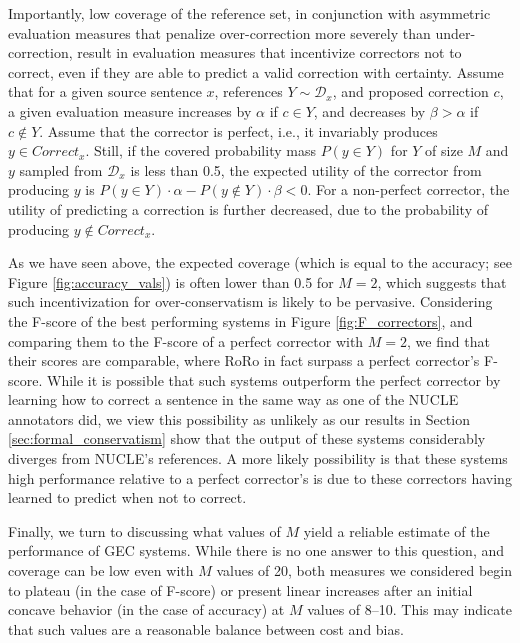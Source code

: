 \documentclass[letter,11pt]{article}
\begin{document}
Importantly, low coverage of the reference set,
in conjunction with asymmetric evaluation measures that penalize over-correction
more severely than under-correction, result in evaluation measures that incentivize
correctors not to correct, even if they are able to predict a valid correction with certainty.
Assume that for a given source sentence $x$, references $Y \sim \mathcal{D}_x$, and proposed correction $c$,
a given evaluation measure increases by $\alpha$ if $c \in Y$, and decreases by $\beta > \alpha$ if $c \notin Y$.
Assume that the corrector is perfect, i.e., it invariably produces $y \in Correct_x$.
Still, if the covered probability mass $P(y \in Y)$ for $Y$ of size $M$ and $y$ sampled from $\mathcal{D}_x$
is less than 0.5, the expected utility of the corrector from producing $y$ is $P(y \in Y) \cdot \alpha - P(y \notin Y) \cdot \beta < 0$.
For a non-perfect corrector, the utility of predicting a correction is further decreased, due to the probability
of producing $y \notin Correct_x$.

As we have seen above, the expected coverage (which is equal to the accuracy; see Figure \ref{fig:accuracy_vals})
is often lower than 0.5 for $M=2$, which suggests that such incentivization for over-conservatism is likely to be
pervasive. Considering the F-score of the best performing systems in Figure \ref{fig:F_correctors}, and
comparing them to the F-score of a perfect corrector with $M=2$, we find that their scores are comparable,
where RoRo in fact surpass a perfect corrector's F-score.
While it is possible that such systems outperform the perfect corrector by learning how to
correct a sentence in the same way as one of the NUCLE annotators did, we view this possibility
as unlikely as our results in Section \ref{sec:formal_conservatism} show that the output of these systems
considerably diverges from NUCLE's references.
A more likely possibility is that these systems high performance relative to a perfect corrector's
is due to these correctors having learned to predict when not to correct.

Finally, we turn to discussing what values of $M$ yield a reliable estimate of the performance
of GEC systems. While there is no one answer to this question, and coverage can be low
even with $M$ values of 20, both measures we considered begin
to plateau (in the case of F-score) or present linear increases after an initial
concave behavior (in the case of accuracy) at $M$ values of 8--10.
This may indicate that such values are a reasonable balance between cost and bias.
\end{document}
